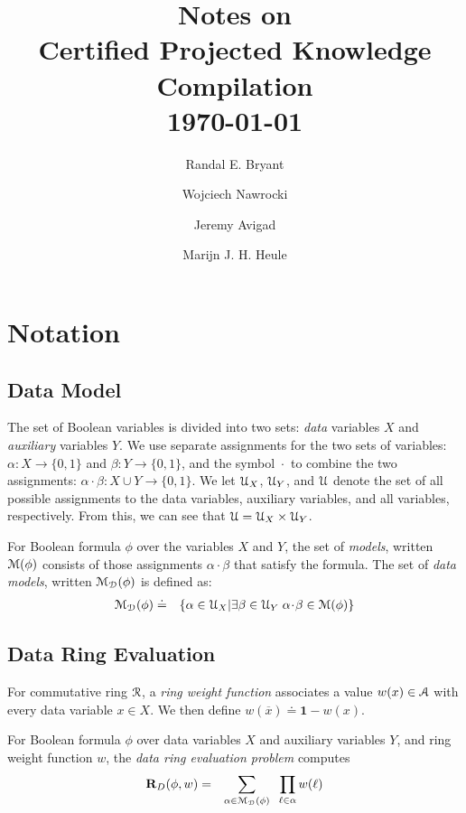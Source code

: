 \documentclass[letterpaper,USenglish,cleveref, autoref, thm-restate]{lipics-v2021}
\title{Notes on \\ Certified Projected Knowledge Compilation \\ \today }
\author{Randal E. Bryant}{Computer Science Department, Carnegie Mellon University, Pittsburgh, PA 15213 USA}{Randy.Bryant@cs.cmu.edu}{https://orcid.org/0000-0001-5024-6613}{Supported by NSF grant CCF-2108521}
\author{Wojciech Nawrocki}{Department of Philosophy, Carnegie Mellon University}{wjnawrocki@cmu.edu}{https://orcid.org/0000-0002-8839-0618}{Hoskinson Center for Formal Mathematics}
\author{Jeremy Avigad}{Department of Philosophy, Carnegie Mellon University}{avigad@cmu.edu}{https://orcid.org/0000-0003-1275-315X}{Hoskinson Center for Formal Mathematics}
\author{Marijn J. H. Heule}{Computer Science Department, Carnegie Mellon University}{marijn@cmu.edu}{https://orcid.org/0000-0002-5587-8801}{Supported by NSF grant CCF-2108521}
\newcommand{\obar}[1]{\overline{#1}}
\newcommand{\lit}{\ell}
\newcommand{\dvarset}{X}
\newcommand{\avarset}{Y}
\newcommand{\ring}{{\cal R}}
\newcommand{\dset}{{\cal A}}
\newcommand{\drep}{\textbf{R}_D}
\newcommand{\mulident}{\textbf{1}}
\newcommand{\dassign}{\alpha}
\newcommand{\aassign}{\beta}
\newcommand{\acombine}{\!\cdot\!}
\newcommand{\uassign}{{\cal U}}
\newcommand{\udassign}{\uassign_X}
\newcommand{\uaassign}{\uassign_Y}
\newcommand{\modelset}{{\cal M}}
\newcommand{\dmodelset}{{\cal M_{D}}}
\begin{document}
\maketitle

\section{Notation}

\subsection{Data Model}

The set of Boolean variables is divided into two sets: {\em data} variables
$\dvarset$ and {\em auxiliary} variables $\avarset$.  We use separate
assignments for the two sets of variables:
$\dassign \colon \dvarset \rightarrow \{0,1\}$
 and
 $\aassign \colon \avarset \rightarrow \{0,1\}$, and the symbol $\acombine$ to combine the two assignments:
 $\dassign\acombine\aassign \colon \dvarset\cup\avarset \rightarrow \{0,1\}$.
We let $\udassign$, $\uaassign$, and $\uassign$ denote the set of all
possible assignments to the data variables, auxiliary variables, and
all variables, respectively.  From this, we can see that
$\uassign = \udassign \times \uaassign$.

For Boolean formula $\phi$ over the variables $\dvarset$ and
$\avarset$, the set of {\em models}, written $\modelset(\phi)$
consists of those assignments $\dassign \acombine \aassign$ that
satisfy the formula.  The set of {\em data models}, written $\dmodelset(\phi)$ is defined as:
\begin{eqnarray}
\dmodelset(\phi) & \doteq & \{ \dassign \in \udassign | \exists \aassign \in \uaassign \; \dassign\acombine\aassign \in \modelset(\phi) \} \label{eqn:dmodelset}
\end{eqnarray}

\subsection{Data Ring Evaluation}

  For commutative ring $\ring$, a {\em ring weight function} associates a value $w(x) \in \dset$ with
  every data variable $x \in \dvarset$.  We then define $w(\obar{x}) \doteq \mulident-w(x)$.

  For Boolean formula $\phi$ over data variables $\dvarset$ and auxiliary variables $\avarset$, and ring weight function $w$, the {\em data ring evaluation problem} computes
  \begin{eqnarray}
    \drep(\phi, w) & = & \sum_{\alpha \in \dmodelset(\phi)} \;\; \prod_{\lit \in \alpha} w(\ell) \label{eqn:rep}
  \end{eqnarray}
\end{document}
